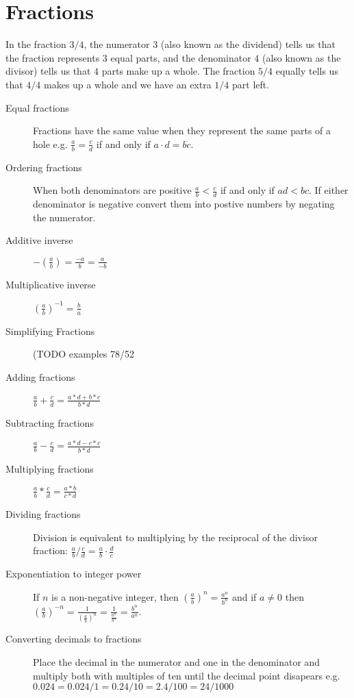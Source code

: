 \section{Fractions}
In the fraction $3/4$, the numerator $3$ (also known as the dividend)
tells us that the fraction represents $3$ equal parts, and the
denominator $4$ (also known as the divisor) tells us that $4$ parts make
up a whole. The fraction $5/4$ equally tells us that $4/4$ makes up a
whole and we have an extra $1/4$ part left.
\begin{description}
\item [Equal fractions] Fractions have the same value when they represent the
same parts of a hole e.g. $\frac{a}{b} = \frac{c}{d}$ if and only if
$a \cdot d = b \dot c$.
\item [Ordering fractions] When both denominators are positive
$\frac{a}{b} < \frac{c}{d}$ if and only if $ad < bc$. If either denominator is
negative convert them into postive numbers by negating the numerator.
\item [Additive inverse] $-\left(\frac{a}{b}\right) = \frac{-a}{b} = \frac{a}{-b}$
\item [Multiplicative inverse] $\left(\frac{a}{b}\right)^{-1} = \frac{b}{a}$
\item [Simplifying Fractions] (TODO examples 78/52
\item [Adding fractions] $\frac{a}{b} + \frac{c}{d} = \frac{a*d + b*c}{b*d}$
\item [Subtracting fractions] $\frac{a}{b} - \frac{c}{d} = \frac{a*d - c*c}{b*d}$
\item [Multiplying fractions] $\frac{a}{b} * \frac{c}{d} = \frac{a*b}{c*d}$
\item [Dividing fractions] Division is equivalent to multiplying by the
reciprocal of the divisor fraction: $\frac{a}{b}/\frac{c}{d} =
\frac{a}{b} \cdot \frac{d}{c}$
\item [Exponentiation to integer power] If $n$ is a non-negative integer, then
$\left(\frac{a}{b}\right)^{n} = \frac{a^n}{b^n}$ and if $a \neq 0$ then
$\left(\frac{a}{b}\right)^{-n} = \frac{1}{\left(\frac{a}{b}\right)^n} =
\frac{1}{\frac{a^n}{b^n}} =\frac{b^n}{a^n}$.
\item [Converting decimals to fractions] Place the decimal in the numerator
and one in the denominator and multiply both with multiples of ten until the
decimal point disapears e.g. $0.024 = 0.024/1 = 0.24/10 = 2.4/100 = 24/1000$
\end{description}

